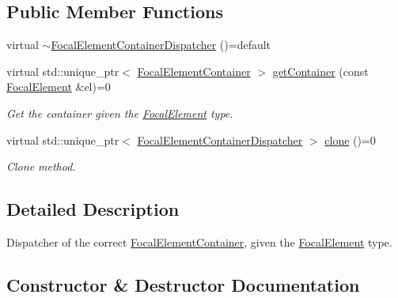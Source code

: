 \subsection*{Public Member Functions}
\begin{DoxyCompactItemize}
\item 
virtual \hyperlink{classFocalElementContainerDispatcher_adc837f38d6ef66d919fc55c9a7933d1b}{$\sim$\+Focal\+Element\+Container\+Dispatcher} ()=default
\item 
virtual std\+::unique\+\_\+ptr$<$ \hyperlink{classFocalElementContainer}{Focal\+Element\+Container} $>$ \hyperlink{classFocalElementContainerDispatcher_af429ae69c47220d55b30cf7e41ee6928}{get\+Container} (const \hyperlink{classFocalElement}{Focal\+Element} \&el)=0
\begin{DoxyCompactList}\small\item\em Get the container given the \hyperlink{classFocalElement}{Focal\+Element} type. \end{DoxyCompactList}\item 
virtual std\+::unique\+\_\+ptr$<$ \hyperlink{classFocalElementContainerDispatcher}{Focal\+Element\+Container\+Dispatcher} $>$ \hyperlink{classFocalElementContainerDispatcher_a710d8bb32947cde2ad5c5e914f33b767}{clone} ()=0
\begin{DoxyCompactList}\small\item\em Clone method. \end{DoxyCompactList}\end{DoxyCompactItemize}


\subsection{Detailed Description}
Dispatcher of the correct \hyperlink{classFocalElementContainer}{Focal\+Element\+Container}, given the \hyperlink{classFocalElement}{Focal\+Element} type. 

\subsection{Constructor \& Destructor Documentation}
\hypertarget{classFocalElementContainerDispatcher_adc837f38d6ef66d919fc55c9a7933d1b}{}
